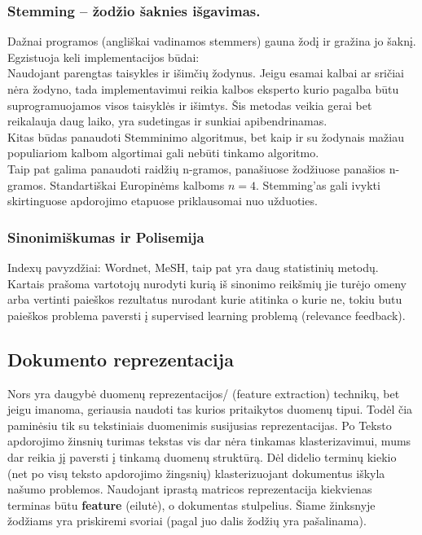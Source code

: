 \documentclass{VUMIFInfKursinis}
\begin{document}
		\subsubsection{Stemming – žodžio šaknies išgavimas.}
			Dažnai programos (angliškai vadinamos stemmers) gauna žodį ir gražina jo šaknį. Egzistuoja keli implementacijos būdai: \\
			Naudojant parengtas taisykles ir išimčių žodynus. Jeigu esamai kalbai ar sričiai nėra žodyno, tada implementavimui reikia kalbos eksperto kurio pagalba būtu suprogramuojamos visos taisyklės ir išimtys. Šis metodas veikia gerai bet reikalauja daug laiko, yra sudetingas ir sunkiai apibendrinamas.
			\\Kitas būdas panaudoti Stemminimo algoritmus, bet kaip ir su žodynais mažiau populiariom kalbom algortimai gali nebūti tinkamo algoritmo. 
			\\Taip pat galima panaudoti raidžių n-gramos, panašiuose žodžiuose panašios n-gramos. Standartiškai Europinėms kalboms $n = 4$. Stemming’as gali ivykti skirtinguose apdorojimo etapuose priklausomai nuo užduoties.

		\subsubsection{Sinonimiškumas ir Polisemija}
			Indexų pavyzdžiai: Wordnet, MeSH, taip pat yra daug statistinių metodų. Kartais prašoma vartotojų nurodyti kurią iš sinonimo reikšmių jie turėjo omeny arba vertinti paieškos rezultatus nurodant kurie atitinka o kurie ne, tokiu butu paieškos problema paversti į supervised learning problemą (relevance feedback).

	\subsection{Dokumento reprezentacija}
		Nors yra daugybė duomenų reprezentacijos/ (feature extraction) technikų, bet jeigu imanoma, geriausia naudoti tas kurios pritaikytos duomenų tipui\cite{alelyani2013feature}. Todėl čia paminėsiu tik su tekstiniais duomenimis susijusias reprezentacijas.
		Po Teksto apdorojimo žinsnių turimas tekstas vis dar nėra tinkamas klasterizavimui, mums dar reikia jį paversti į tinkamą duomenų struktūrą. Dėl didelio terminų kiekio (net po visų teksto apdorojimo žingsnių) klasterizuojant dokumentus iškyla našumo problemos. Naudojant iprastą matricos reprezentacija kiekvienas terminas būtu \textbf{feature} (eilutė), o dokumentas stulpelius. Šiame žinksnyje žodžiams yra priskiremi svoriai (pagal juo dalis žodžių yra pašalinama).
\end{document}

